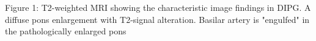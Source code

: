 Figure 1: T2-weighted MRI showing the characteristic image findings in DIPG. A diffuse pons enlargement with T2-signal alteration. Basilar artery is "engulfed" in the pathologically enlarged pons